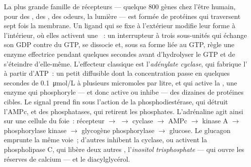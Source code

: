 \begin{proposition}\label{prop:b2:cell-signalling:gpcr}
La plus grande famille de récepteurs --- quelque \num{800} gènes chez
l'être humain, pour des , des , des odeurs, la
lumière --- est formée de protéines qui traversent sept fois la
membrane. Un ligand qui se fixe à l'extérieur modifie leur forme à
l'intérieur, où elles activent une \emph{}~: un interrupteur à
trois sous-unités qui échange son GDP contre du GTP, se dissocie et, sous
sa forme liée au GTP, règle une enzyme effectrice pendant quelques
secondes avant d'hydrolyser le GTP et de s'éteindre d'elle-même.
L'effecteur classique est l'\emph{adénylate cyclase}, qui fabrique
l'\emph{} à partir d'ATP~: un petit \emph{}
diffusible dont la concentration passe en quelques secondes de
\qty{0.1}{\micro mol/L} à plusieurs micromoles par litre, et qui active la
\emph{}, une enzyme qui phosphoryle --- et donc active
ou inhibe --- des dizaines de protéines cibles. Le signal prend fin sous
l'action de la phosphodiestérase, qui détruit l'AMPc, et des
phosphatases, qui retirent les phosphates. L'adrénaline agit ainsi sur
une cellule du foie~: récepteur $\to$ 
$\to$ cyclase $\to$ AMPc $\to$ kinase A $\to$ phosphorylase kinase
$\to$ glycogène phosphorylase $\to$ glucose. Le glucagon emprunte la
même voie~; d'autres  inhibent la cyclase, ou activent la
phospholipase C, qui libère deux autres ,
l'\emph{inositol trisphosphate} --- qui ouvre les réserves de calcium ---
et le diacylglycérol.
\end{proposition}
